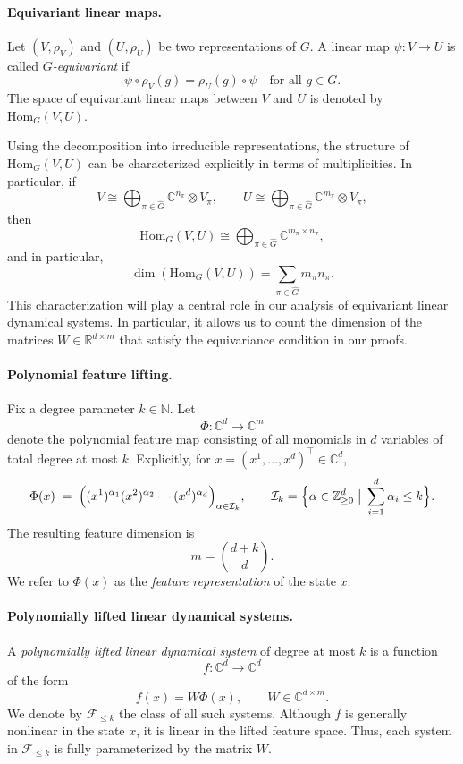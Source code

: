 \documentclass[11pt]{article}
\theoremstyle{plain}
\theoremstyle{definition}
\theoremstyle{remark}
\begin{document}
\paragraph{Equivariant linear maps.}
Let $(V,\rho_V)$ and $(U,\rho_U)$ be two representations of $G$. A linear map $\psi : V \to U$ is called \emph{$G$-equivariant} if
\[
\psi \circ \rho_V(g) = \rho_U(g) \circ \psi
\quad \text{for all } g \in G.
\]
The space of equivariant linear maps between $V$ and $U$ is denoted by $\mathrm{Hom}_G(V,U)$.

Using the decomposition into irreducible representations, the structure of $\mathrm{Hom}_G(V,U)$ can be characterized explicitly in terms of multiplicities. In particular, if
\[
V \cong \bigoplus_{\pi \in \widehat{G}} \mathbb{C}^{n_\pi} \otimes V_\pi,
\qquad
U \cong \bigoplus_{\pi \in \widehat{G}} \mathbb{C}^{m_\pi} \otimes V_\pi,
\]
then
\[
\mathrm{Hom}_G(V,U) \cong \bigoplus_{\pi \in \widehat{G}} \mathbb{C}^{m_\pi \times n_\pi},
\]
and in particular,
\[
\dim (\mathrm{Hom}_G(V,U)) = \sum_{\pi \in \widehat{G}} m_\pi n_\pi.
\]
This characterization will play a central role in our analysis of equivariant linear dynamical systems. In particular, it allows us to count the dimension of the matrices $W \in \mathbb{R}^{d \times m}$ that satisfy the equivariance condition in our proofs.








\paragraph{Polynomial feature lifting.}
Fix a degree parameter $k \in \mathbb{N}$. Let
\[
\Phi : \mathbb{C}^d \to \mathbb{C}^m
\]
denote the polynomial feature map consisting of all monomials in $d$ variables of total degree at most $k$. Explicitly, for $x = (x^1,\dots,x^d)^\top \in \mathbb{C}^d$,
\[
\Phi(x)
\;=\;
\Bigl(
(x^{1})^{\alpha_1} (x^{2})^{\alpha_2} \cdots (x^{d})^{\alpha_d}
\Bigr)_{\alpha \in \mathcal{I}_k},
\qquad
\mathcal{I}_k
=
\Bigl\{
\alpha \in \mathbb{Z}_{\ge 0}^d
\;\big|\;
\sum_{i=1}^d \alpha_i \le k
\Bigr\}.
\]
The resulting feature dimension is
\[
m = \binom{d+k}{d}.
\]
We refer to $\Phi(x)$ as the \emph{feature representation} of the state $x$.

\paragraph{Polynomially lifted linear dynamical systems.}
A \emph{polynomially lifted linear dynamical system} of degree at most $k$ is a function
\[
f : \mathbb{C}^d \to \mathbb{C}^d
\]
of the form
\[
f(x) = W \Phi(x),
\qquad W \in \mathbb{C}^{d \times m}.
\]
We denote by $\mathcal{F}_{\le k}$ the class of all such systems. Although $f$ is generally nonlinear in the state $x$, it is linear in the lifted feature space. Thus, each system in $\mathcal{F}_{\le k}$ is fully parameterized by the matrix $W$.
\end{document}
